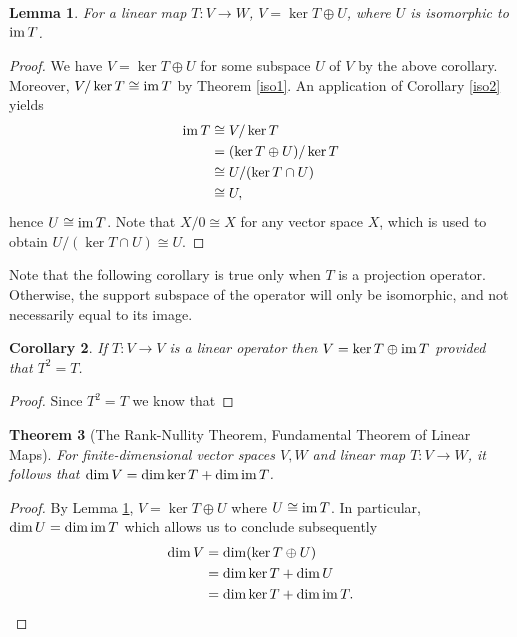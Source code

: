 \documentclass[12pt]{article}
\theoremstyle{definition}
\theoremstyle{plain}
\newtheorem{theorem}{Theorem}[section]
\newtheorem{corollary}[theorem]{Corollary}
\newtheorem{lemma}[theorem]{Lemma}
\numberwithin{equation}{section}
\theoremstyle{definition}
\begin{document}
\begin{lemma} \label{ker_sum}
For a linear map $ T : V \to W $, $ V = \ker T \oplus U $, where $ U $ is isomorphic to $ \operatorname{im} T $.
\end{lemma}

\begin{proof}
We have $ V = \ker T \oplus U $ for some subspace $ U $ of $ V $ by the above corollary. Moreover, $ V / \ker T \cong \operatorname{im} T $ by Theorem \ref{iso1}. An application of Corollary \ref{iso2} yields
\begin{align*}
	\operatorname{im} T &\cong V / \ker T\\
	&= (\ker T \oplus U) / \ker T\\
	&\cong U / (\ker T \cap U)\\
	&\cong U,
\end{align*}
hence $ U \cong \operatorname{im} T $. Note that $ X / 0 \cong X $ for any vector space $ X $, which is used to obtain $ U / (\ker T \cap U) \cong U $.
\end{proof}

Note that the following corollary is true only when $ T $ is a projection operator. Otherwise, the support subspace of the operator will only be isomorphic, and not necessarily equal to its image.

\begin{corollary}
If $ T: V \to V $ is a linear operator then $ V = \ker T \oplus \operatorname{im} T $ provided that $ T^2 = T $.
\end{corollary}

\begin{proof}
Since $ T^2 = T $ we know that 
\end{proof}


\begin{theorem} [The Rank-Nullity Theorem, Fundamental Theorem of Linear Maps]
For finite-dimensional vector spaces $ V, W$ and linear map $ T : V \to W$, it follows that
$ \dim V = \dim \ker T + \dim \operatorname{im} T$.
\end{theorem}

\begin{proof}
By Lemma \ref{ker_sum}, $ V = \ker T \oplus U $ where $ U \cong \operatorname{im} T $. In particular, $ \dim U = \dim \operatorname{im} T $ which allows us to conclude subsequently
\begin{align*}
	\dim V &= \dim (\ker T \oplus U)\\
	&= \dim \ker T + \dim U\\
	&= \dim \ker T + \dim \operatorname{im} T.
\end{align*}
\end{proof}
\end{document}

